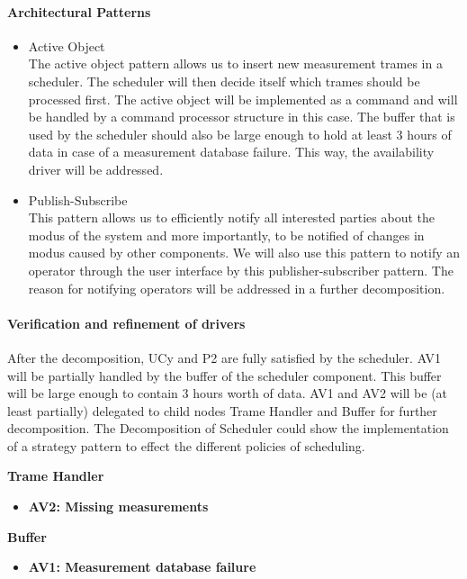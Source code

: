 \paragraph{Architectural Patterns}
\begin{itemize}
	\item Active Object\\
	The active object pattern allows us to insert new measurement trames
		in a scheduler. The scheduler will then decide itself which trames should
		be processed first. The active object will be implemented as a command and will be handled by a command processor structure in this case.
	The buffer that is used by the scheduler should also be large enough to hold at least 3 hours of data in case of a measurement database failure. This way, the availability driver will be addressed.
	\item Publish-Subscribe\\
	This pattern allows us to efficiently notify all interested parties
		about the modus of the system and more importantly, to be notified of changes in modus caused by other components. We will also use this pattern to
		notify an operator through the user interface by this publisher-subscriber
		pattern. The reason for notifying operators will be addressed in a further decomposition.
\end{itemize}

\paragraph{Verification and refinement of drivers}
After the decomposition, UCy and P2 are fully satisfied by the scheduler.
AV1 will be partially handled by the buffer of the scheduler component. This buffer
	will be large enough to contain 3 hours worth of data.
AV1 and AV2 will be (at least partially)  delegated to child nodes Trame Handler and Buffer for further decomposition. 
The Decomposition of Scheduler could show the implementation of a strategy pattern to effect the different policies of scheduling.

\textbf{Trame Handler}
\begin{itemize}
	\item \textbf{AV2: Missing measurements }
\end{itemize}

\textbf{Buffer}
\begin{itemize}
	\item \textbf{AV1: Measurement database failure }
\end{itemize}

